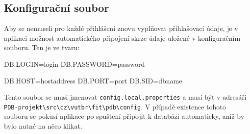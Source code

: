\documentclass[11pt,a4paper]{article}
\begin{document}
 \subsection{Konfigurační soubor}\label{conf}
 Aby se nemuseli pro každé přihlášení znovu vyplňovat přihlašovací údaje, je v aplikaci možnost automatického připojení skrze údaje uložené v konfiguračním souboru. Ten je ve tvaru:
 \begin{center}
\begin{boxedverbatim}
DB.LOGIN=login
DB.PASSWORD=password

DB.HOST=hostaddress
DB.PORT=port
DB.SID=dbname
\end{boxedverbatim}
\end{center}
Tento soubor se musí jmenovat \texttt{config.local.properties} a musí být v adresáři \verb;PDB-projekt\src\cz\vutbr\fit\pdb\config;. V případě existence tohoto souboru se pokusí aplikace po spuštení připojit k databázi automaticky, aniž by bylo nutné na něco klikat.
\end{document}
